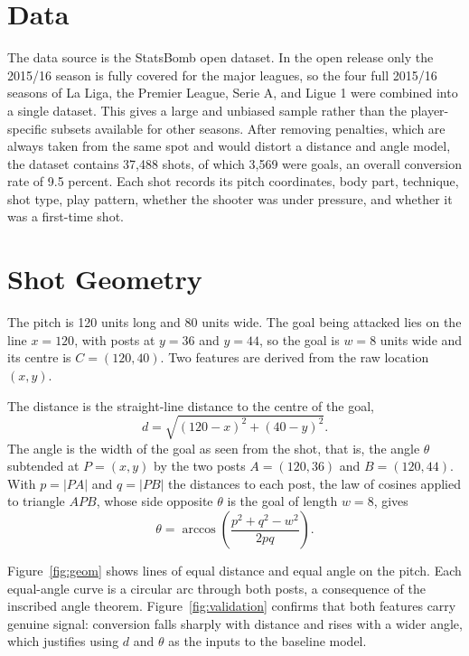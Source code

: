 \documentclass[11pt]{article}
\begin{document}
\section{Data}

The data source is the StatsBomb open dataset. In the open release only the
2015/16 season is fully covered for the major leagues, so the four full 2015/16
seasons of La Liga, the Premier League, Serie A, and Ligue 1 were combined into a
single dataset. This gives a large and unbiased sample rather than the
player-specific subsets available for other seasons. After removing penalties,
which are always taken from the same spot and would distort a distance and angle
model, the dataset contains 37{,}488 shots, of which 3{,}569 were goals, an
overall conversion rate of 9.5 percent. Each shot records its pitch coordinates,
body part, technique, shot type, play pattern, whether the shooter was under
pressure, and whether it was a first-time shot.

\section{Shot Geometry}

The pitch is 120 units long and 80 units wide. The goal being attacked lies on
the line $x = 120$, with posts at $y = 36$ and $y = 44$, so the goal is $w = 8$
units wide and its centre is $C = (120, 40)$. Two features are derived from the
raw location $(x, y)$.

The distance is the straight-line distance to the centre of the goal,
\begin{equation}
  d = \sqrt{(120-x)^2 + (40-y)^2}.
\end{equation}
The angle is the width of the goal as seen from the shot, that is, the angle
$\theta$ subtended at $P=(x,y)$ by the two posts $A=(120,36)$ and $B=(120,44)$.
With $p = |PA|$ and $q = |PB|$ the distances to each post, the law of cosines
applied to triangle $APB$, whose side opposite $\theta$ is the goal of length
$w=8$, gives
\begin{equation}
  \theta = \arccos\!\left(\frac{p^2 + q^2 - w^2}{2pq}\right).
\end{equation}

Figure~\ref{fig:geom} shows lines of equal distance and equal angle on the pitch.
Each equal-angle curve is a circular arc through both posts, a consequence of the
inscribed angle theorem. Figure~\ref{fig:validation} confirms that both features
carry genuine signal: conversion falls sharply with distance and rises with a
wider angle, which justifies using $d$ and $\theta$ as the inputs to the baseline
model.
\end{document}
